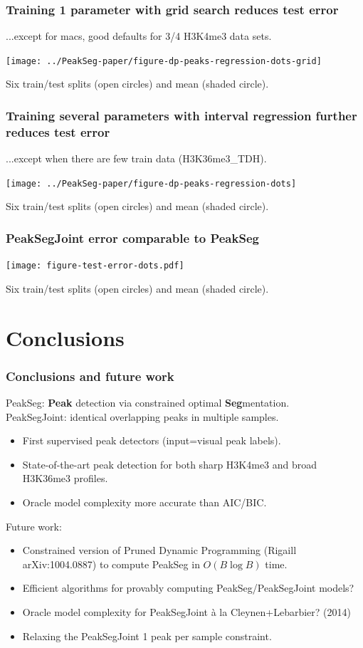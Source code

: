 \documentclass{beamer}
\begin{document}
\begin{frame}
  \frametitle{Training 1 parameter with grid search reduces test error}

  ...except for macs, good defaults for 3/4 H3K4me3 data sets.

  \texttt{[image: ../PeakSeg-paper/figure-dp-peaks-regression-dots-grid]}

  Six train/test splits (open circles) and mean (shaded circle).
\end{frame}

\begin{frame}
  \frametitle{Training several parameters with interval regression 
    further reduces test error}

  ...except when there are few train data (H3K36me3\_TDH).

  \texttt{[image: ../PeakSeg-paper/figure-dp-peaks-regression-dots]}

  Six train/test splits (open circles) and mean (shaded circle).
\end{frame}


\begin{frame}
  \frametitle{PeakSegJoint error comparable to PeakSeg}

  \texttt{[image: figure-test-error-dots.pdf]}

  Six train/test splits (open circles) and mean (shaded circle).
\end{frame}

\section{Conclusions}

\begin{frame}
  \frametitle{Conclusions and future work}
  PeakSeg: \textbf{Peak} detection via constrained optimal
  \textbf{Seg}mentation.\\
  PeakSegJoint: identical overlapping peaks in multiple samples.
  \begin{itemize}
  \item First supervised peak detectors (input=visual peak labels).
  \item State-of-the-art peak detection for both sharp H3K4me3 and
    broad H3K36me3 profiles.
  \item Oracle model complexity more accurate than AIC/BIC.
  \end{itemize}
  Future work:
  \begin{itemize}
  \item Constrained version of Pruned Dynamic Programming (Rigaill
    arXiv:1004.0887) to compute PeakSeg in $O(B\log B)$ time.
  \item Efficient algorithms for provably computing
    PeakSeg/PeakSegJoint models?
  \item Oracle model complexity for PeakSegJoint \`a la
    Cleynen+Lebarbier?  (2014)
  \item Relaxing the PeakSegJoint 1 peak per sample constraint.
  \end{itemize}
\end{frame}
\end{document}
